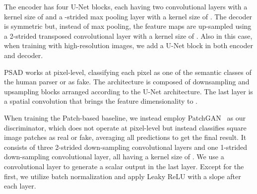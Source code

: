  The encoder has four U-Net blocks, each having two convolutional layers with a kernel size of  and a -strided max pooling layer with a kernel size of . The decoder is symmetric but, instead of max pooling, the feature maps are up-sampled using a 2-strided transposed convolutional layer with a kernel size of . Also in this case, when training with high-resolution images, we add a U-Net block in both encoder and decoder.

 PSAD works at pixel-level, classifying each pixel as one of the  semantic classes of the human parser or as fake. The architecture is composed of  downsampling and  upsampling blocks arranged according to the U-Net architecture. The last layer is a  spatial convolution that brings the feature dimensionality to . 

When training the Patch-based baseline, we instead employ PatchGAN~\cite{isola2017image} as our discriminator, which does not operate at pixel-level but instead classifies square image patches as real or fake, averaging all predictions to get the final result. It consists of three 2-strided down-sampling convolutional layers and one 1-strided down-sampling convolutional layer, all having a kernel size of . We use a convolutional layer to generate a scalar output in the last layer. Except for the first, we utilize batch normalization and apply Leaky ReLU with a  slope after each layer.

